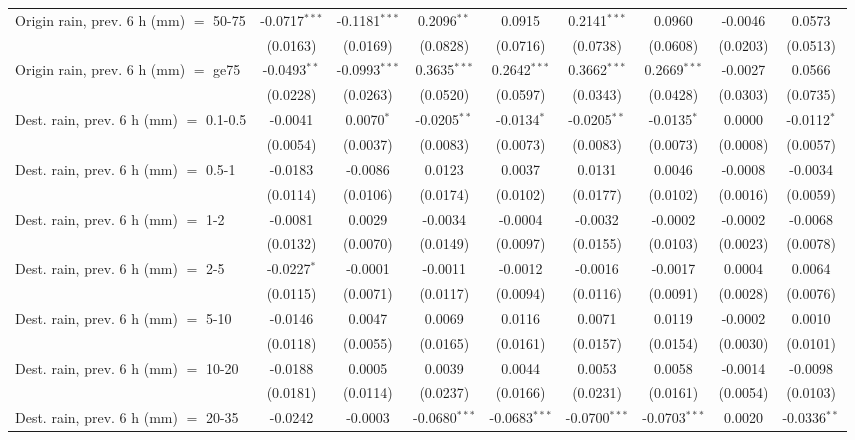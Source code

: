 \begin{tabular}{lcccccccc}
   Origin rain, prev. 6 h (mm) $=$ 50-75 & -0.0717$^{***}$ & -0.1181$^{***}$ & 0.2096$^{**}$ & 0.0915 & 0.2141$^{***}$ & 0.0960 & -0.0046 & 0.0573\\
    & (0.0163) & (0.0169) & (0.0828) & (0.0716) & (0.0738) & (0.0608) & (0.0203) & (0.0513)\\
   Origin rain, prev. 6 h (mm) $=$ ge75 & -0.0493$^{**}$ & -0.0993$^{***}$ & 0.3635$^{***}$ & 0.2642$^{***}$ & 0.3662$^{***}$ & 0.2669$^{***}$ & -0.0027 & 0.0566\\
    & (0.0228) & (0.0263) & (0.0520) & (0.0597) & (0.0343) & (0.0428) & (0.0303) & (0.0735)\\
   Dest. rain, prev. 6 h (mm) $=$ 0.1-0.5 & -0.0041 & 0.0070$^{*}$ & -0.0205$^{**}$ & -0.0134$^{*}$ & -0.0205$^{**}$ & -0.0135$^{*}$ & 0.0000 & -0.0112$^{*}$\\
    & (0.0054) & (0.0037) & (0.0083) & (0.0073) & (0.0083) & (0.0073) & (0.0008) & (0.0057)\\
   Dest. rain, prev. 6 h (mm) $=$ 0.5-1 & -0.0183 & -0.0086 & 0.0123 & 0.0037 & 0.0131 & 0.0046 & -0.0008 & -0.0034\\
    & (0.0114) & (0.0106) & (0.0174) & (0.0102) & (0.0177) & (0.0102) & (0.0016) & (0.0059)\\
   Dest. rain, prev. 6 h (mm) $=$ 1-2 & -0.0081 & 0.0029 & -0.0034 & -0.0004 & -0.0032 & -0.0002 & -0.0002 & -0.0068\\
    & (0.0132) & (0.0070) & (0.0149) & (0.0097) & (0.0155) & (0.0103) & (0.0023) & (0.0078)\\
   Dest. rain, prev. 6 h (mm) $=$ 2-5 & -0.0227$^{*}$ & -0.0001 & -0.0011 & -0.0012 & -0.0016 & -0.0017 & 0.0004 & 0.0064\\
    & (0.0115) & (0.0071) & (0.0117) & (0.0094) & (0.0116) & (0.0091) & (0.0028) & (0.0076)\\
   Dest. rain, prev. 6 h (mm) $=$ 5-10 & -0.0146 & 0.0047 & 0.0069 & 0.0116 & 0.0071 & 0.0119 & -0.0002 & 0.0010\\
    & (0.0118) & (0.0055) & (0.0165) & (0.0161) & (0.0157) & (0.0154) & (0.0030) & (0.0101)\\
   Dest. rain, prev. 6 h (mm) $=$ 10-20 & -0.0188 & 0.0005 & 0.0039 & 0.0044 & 0.0053 & 0.0058 & -0.0014 & -0.0098\\
    & (0.0181) & (0.0114) & (0.0237) & (0.0166) & (0.0231) & (0.0161) & (0.0054) & (0.0103)\\
   Dest. rain, prev. 6 h (mm) $=$ 20-35 & -0.0242 & -0.0003 & -0.0680$^{***}$ & -0.0683$^{***}$ & -0.0700$^{***}$ & -0.0703$^{***}$ & 0.0020 & -0.0336$^{**}$\\

\end{tabular}
